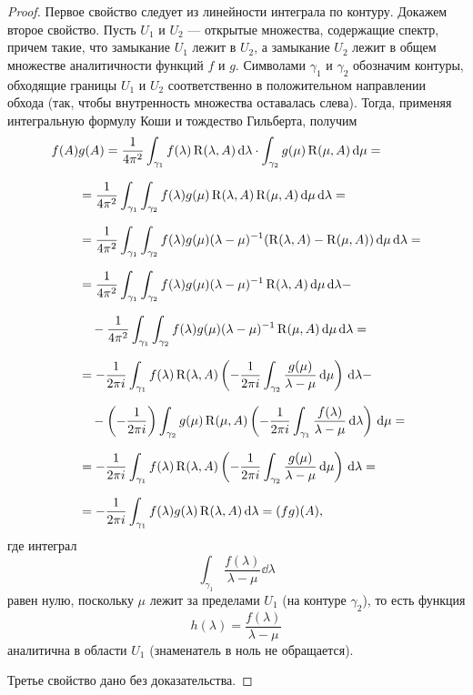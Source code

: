 \begin{proof}
    Первое свойство следует из линейности интеграла по контуру. Докажем второе свойство.    
    Пусть $U_1$ и $U_2$ --- открытые множества, содержащие спектр, причем такие, что замыкание 
    $U_1$ лежит в $U_2$, а замыкание $U_2$ лежит в общем множестве аналитичности функций $f$ и $g$.
    Символами $\gamma_1$ и $\gamma_2$ обозначим контуры, обходящие границы $U_1$ и $U_2$ 
    соответственно в положительном направлении обхода (так, чтобы внутренность множества 
    оставалась слева). Тогда, применяя интегральную формулу Коши и тождество Гильберта, получим
    \begin{align*}
        f(A)&g(A) = \frac{1}{4 \pi^2}\int_{\gamma_1} f(\lambda) \operatorname{R}(\lambda, A) \,\mathrm{d} \lambda
        \cdot 
        \int_{\gamma_2} g(\mu) \operatorname{R}(\mu, A) \,\mathrm{d} \mu = \\[0.7em]
        &= \frac{1}{4\pi^2} \int_{\gamma_1} \int_{\gamma_2} f(\lambda) g(\mu) 
        \operatorname{R}(\lambda, A) \operatorname{R}(\mu, A) \,\mathrm{d} \mu \,\mathrm{d} \lambda = \\[0.7em]
        &= \frac{1}{4\pi^2} \int_{\gamma_1} \int_{\gamma_2} f(\lambda) g(\mu) (\lambda - \mu)^{-1}
        (\operatorname{R}(\lambda, A) - \operatorname{R}(\mu, A)) \,\mathrm{d} \mu \,\mathrm{d} \lambda = \\[0.7em]
        &= \frac{1}{4\pi^2} \int_{\gamma_1} \int_{\gamma_2} f(\lambda) g(\mu) (\lambda - \mu)^{-1}
        \operatorname{R}(\lambda, A) \,\mathrm{d} \mu \,\mathrm{d} \lambda - \\[0.7em]
        &\quad- \frac{1}{4\pi^2} \int_{\gamma_1} \int_{\gamma_2} f(\lambda) g(\mu) (\lambda - \mu)^{-1}
        \operatorname{R}(\mu, A) \,\mathrm{d} \mu \,\mathrm{d} \lambda = \\[0.7em]
        &= -\frac{1}{2\pi i} \int_{\gamma_1} f(\lambda) \operatorname{R}(\lambda, A) \left( 
        -\frac{1}{2\pi i} \int_{\gamma_2} \frac{g(\mu)}{\lambda - \mu} \,\mathrm{d} \mu \right) 
        \,\mathrm{d} \lambda - \\[0.7em]
        &\quad- \left(-\frac{1}{2\pi i} \right) \int_{\gamma_2} g(\mu) \operatorname{R}(\mu, A) 
        \left( -\frac{1}{2\pi i} \int_{\gamma_1} \frac{f(\lambda)}{\lambda - \mu} \,\mathrm{d} \lambda \right) 
        \,\mathrm{d} \mu = \\[0.7em]
        &= -\frac{1}{2\pi i} \int_{\gamma_1} f(\lambda) \operatorname{R}(\lambda, A) \left( 
        -\frac{1}{2\pi i} \int_{\gamma_2} \frac{g(\mu)}{\lambda - \mu} \,\mathrm{d} \mu \right) 
        \,\mathrm{d} \lambda = \\[0.7em]
        &= -\frac{1}{2\pi i} \int_{\gamma_1} f(\lambda) g(\lambda) \operatorname{R}(\lambda, A)
        \,\mathrm{d} \lambda = (fg)(A),
    \end{align*}
    где интеграл
    \[ \int_{\gamma_1} \frac{f(\lambda)}{\lambda - \mu} \dd \lambda \]
    равен нулю, поскольку $\mu$ лежит за пределами $U_1$ (на контуре $\gamma_2$), то есть функция
    \[ h(\lambda) = \frac{f(\lambda)}{\lambda - \mu} \]
    аналитична в области $U_1$ (знаменатель в ноль не обращается).

    Третье свойство дано без доказательства.
\end{proof}

